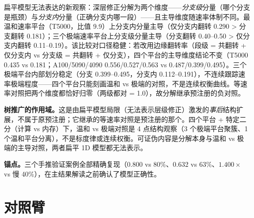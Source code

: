\documentclass[12pt]{ctexart}
\begin{document}
\begin{table}[t]
\centering
{}
\caption{树分解（2$\times$ 2 列联，四格之和为 1）。段级翻转率（共翻转 + 仅分支内）精确复现 1D 主结果（0.434 / 0.556 / 0.527 / 0.563），确认树模型是扁平模型的正确推广而非另一个模型。}
\label{tab:tree}
\end{table}

扁平模型无法表达的新观察：深层修正分解为两个维度——\emph{分支级}分量（哪个分支是瓶颈）与\emph{分支内}分量（正确分支内哪一段）——且主导维度随速率体制不同。最温和速率平台（T5000，比值 9.9）上分支内分量主导（仅分支内翻转 0.290 > 分支翻转 0.181）；三个极端速率平台上分支级分量主导（分支翻转 0.40--0.50 > 仅分支内翻转 0.11--0.19）。该比较对口径稳健：若改用边缘翻转率（段级 = 共翻转 + 仅分支内 vs 分支级 = 共翻转 + 仅分支），四个平台的主导维度结论不变（T5000 0.435 vs 0.181；A100/5090/4090 0.556/0.527/0.563 vs 0.487/0.399/0.495）。三个极端平台内部划分稳定（分支 0.399--0.495，分支内 0.112--0.191），不连续跟踪速率极端程度——四个平台只能刻画温和 vs 极端的对照，不是连续权衡曲线。等速率对照把两个维度都恰好归零（两级都对 = 1.0），故分解继承预注册的负对照。

\textbf{树推广的作用域。}这是由扁平模型局限（无法表示层级修正）激发的\emph{事后}结构扩展，不属于原预注册；它继承的等速率对照是预注册的那个。四个平台 + 特定二分（计算 vs 内存）下，温和 vs 极端对照是 4 点结构观察（3 个极端平台聚簇、1 个温和平台分离），不是标度律或连续权衡。可证伪内容是分解本身与温和 vs 极端的主导对照，两者扁平 1D 模型都无法表示。

\textbf{锚点。}三个手推验证案例全部精确复现（0.800 vs 80\%、0.632 vs 63\%、$1.400\times$ vs 慢 40\%），在主结果解读之前确认了模型正确性。

\section{对照臂}\label{controls}
\end{document}
